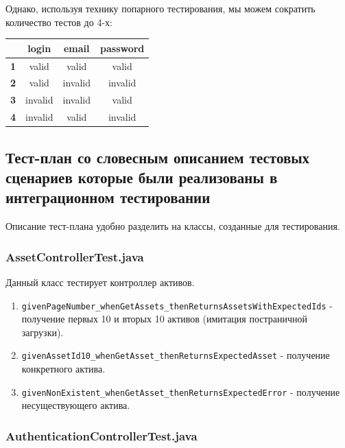 \documentclass[a4paper, 14pt]{article}
\begin{document}
\begin{itemize}
    Однако, используя технику попарного тестирования, мы можем сократить количество тестов до 4-х:
    \begin{table}[H]
        \centering
        \begin{tabular}{|c|c|c|c|}
        \hline
        \textbf{}  & \textbf{login} & \textbf{email} & \textbf{password} \\ \hline
        \textbf{1} & valid          & valid          & valid             \\ \hline
        \textbf{2} & valid          & invalid        & invalid           \\ \hline
        \textbf{3} & invalid        & invalid        & valid             \\ \hline
        \textbf{4} & invalid        & valid          & invalid           \\ \hline
        \end{tabular}
    \end{table}
\end{itemize}

\subsection{Тест-план со словесным описанием тестовых сценариев которые были реализованы в интеграционном тестировании}

Описание тест-плана удобно разделить на классы, созданные для тестирования.

\subsubsection{AssetControllerTest.java}

Данный класс тестирует контроллер активов.

\begin{enumerate}
    \item \texttt{givenPageNumber\_whenGetAssets\_thenReturnsAssetsWithExpectedIds} - получение первых 10 и вторых 10 активов (имитация постраничной загрузки).
    \item \texttt{givenAssetId10\_whenGetAsset\_thenReturnsExpectedAsset} - получение конкретного актива.
    \item \texttt{givenNonExistent\_whenGetAsset\_thenReturnsExpectedError} - получение несуществующего актива.
\end{enumerate}

\subsubsection{AuthenticationControllerTest.java}
\end{document}
